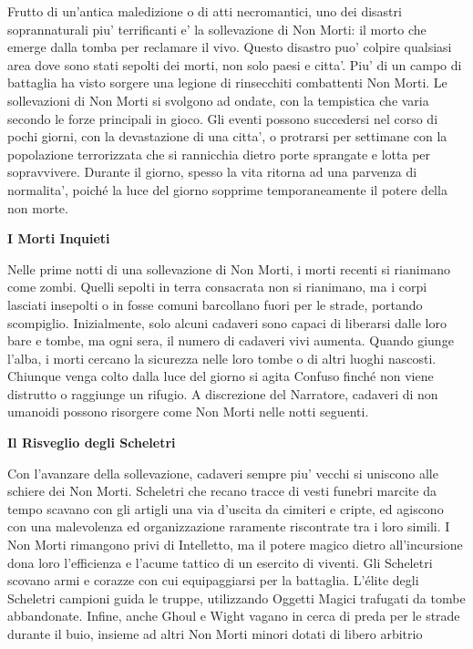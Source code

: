 \documentclass[a4paper,11pt,twoside,openany]{book}
\begin{document}
{Frutto di un'antica maledizione o di atti necromantici, uno dei disastri soprannaturali piu' terrificanti e' la sollevazione di Non Morti: il morto che emerge dal­la tomba per reclamare il vivo. Questo disastro puo' colpire qualsiasi area dove sono stati sepolti dei morti, non solo paesi e citta'. Piu' di un campo di battaglia ha visto sorgere una legione di rinsecchiti combattenti Non Morti. Le sollevazioni di Non Morti si svolgono ad ondate, con la tempistica che varia secondo le forze principali in gioco. Gli eventi possono succedersi nel corso di pochi giorni, con la devastazione di una citta', o protrarsi per settimane con la popolazione terrorizzata che si rannicchia dietro porte sprangate e lotta per sopravvivere. Durante il giorno, spesso la vita ritorna ad una parvenza di normalita', poiché la luce del giorno sopprime temporaneamente il potere della non morte.

\textbf{I Morti Inquieti}

Nelle prime notti di una sollevazione di Non Morti, i morti recenti si rianimano come zombi. Quelli sepolti in terra consacrata non si rianimano, ma i corpi lasciati insepolti o in fosse comuni barcollano fuori per le strade, portando scompiglio. Inizialmente, solo alcuni cadaveri sono capaci di liberarsi dal­le loro bare e tombe, ma ogni sera, il numero di cadaveri vivi aumenta. Quando giunge l'alba, i morti cercano la sicurezza nelle loro tombe o di altri luoghi nascosti. Chiunque venga colto dalla luce del giorno si agita Confuso finché non viene distrutto o raggiunge un rifugio. A discrezione del Narratore, cadaveri di non umanoidi possono risorgere come Non Morti nelle notti seguenti.

\textbf{Il Risveglio degli Scheletri}

Con l'avanzare della sollevazione, cadaveri sempre piu' vecchi si uniscono alle schiere dei Non Morti. Scheletri che recano tracce di vesti funebri marcite da tempo scavano con gli artigli una via d'uscita da cimiteri e cripte, ed agiscono con una malevolenza ed organizzazione raramente riscontrate tra i loro simili. I Non Morti rimangono privi di Intelletto, ma il potere magico dietro all'incursione dona loro l'efficienza e l'acume tattico di un esercito di viventi. Gli Scheletri scovano armi e corazze con cui equipaggiarsi per la battaglia. L'élite degli Scheletri campioni guida le truppe, utilizzando Oggetti Magici trafugati da tombe abbandonate. Infine, anche Ghoul e Wight vagano in cerca di preda per le strade durante il buio, insieme ad altri Non Morti minori dotati di libero arbitrio

}
\end{document}
